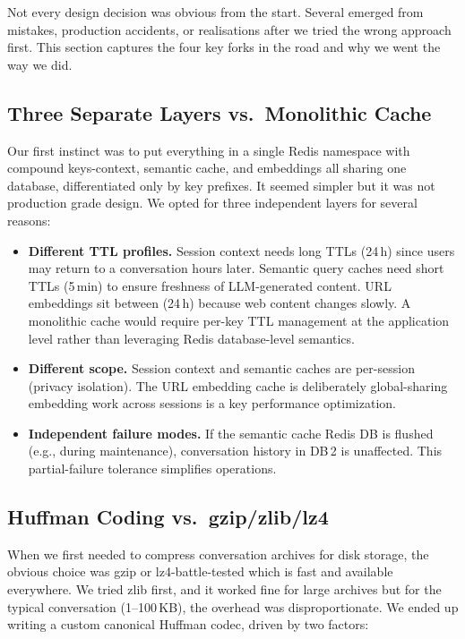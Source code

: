 \documentclass[conference]{IEEEtran}
\begin{document}
Not every design decision was obvious from the start. Several emerged from mistakes, production accidents, or realisations after we tried the wrong approach first. This section captures the four key forks in the road and why we went the way we did.

\subsection{Three Separate Layers vs.\ Monolithic Cache}

Our first instinct was to put everything in a single Redis namespace with compound keys-context, semantic cache, and embeddings all sharing one database, differentiated only by key prefixes. It seemed simpler but it was not production grade design. We opted for three independent layers for several reasons:

\begin{itemize}
\item \textbf{Different TTL profiles.} Session context needs long TTLs (24\,h) since users may return to a conversation hours later. Semantic query caches need short TTLs (5\,min) to ensure freshness of LLM-generated content. URL embeddings sit between (24\,h) because web content changes slowly. A monolithic cache would require per-key TTL management at the application level rather than leveraging Redis database-level semantics.

\item \textbf{Different scope.} Session context and semantic caches are per-session (privacy isolation). The URL embedding cache is deliberately global-sharing embedding work across sessions is a key performance optimization.

\item \textbf{Independent failure modes.} If the semantic cache Redis DB is flushed (e.g., during maintenance), conversation history in DB\,2 is unaffected. This partial-failure tolerance simplifies operations.
\end{itemize}

\subsection{Huffman Coding vs.\ gzip/zlib/lz4}

When we first needed to compress conversation archives for disk storage, the obvious choice was gzip or lz4-battle-tested which is fast and available everywhere. We tried zlib first, and it worked fine for large archives but for the typical conversation (1--100\,KB), the overhead was disproportionate. We ended up writing a custom canonical Huffman codec, driven by two factors:
\end{document}
